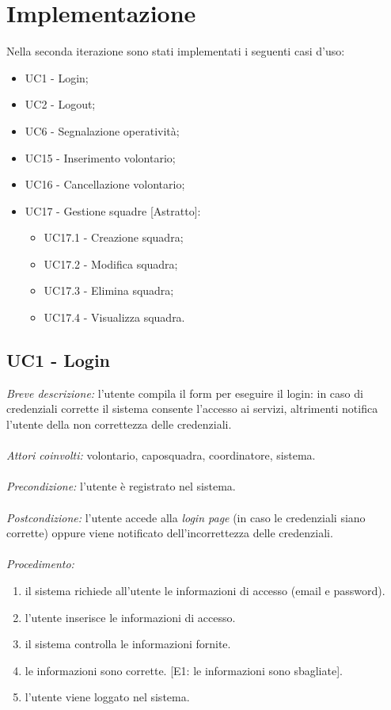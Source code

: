 \section{Implementazione}
Nella seconda iterazione sono stati implementati i seguenti casi d'uso:
\begin{itemize}
	\item UC1 - Login;
	\item UC2 - Logout;
	\item UC6 - Segnalazione operatività;
	\item UC15 - Inserimento volontario;
	\item UC16 - Cancellazione volontario;
	\item UC17 - Gestione squadre [Astratto]:
	\begin{itemize}
		\item UC17.1 - Creazione squadra;
		\item UC17.2 - Modifica squadra;
		\item UC17.3 - Elimina squadra;
		\item UC17.4 - Visualizza squadra.
	\end{itemize}
\end{itemize}

\subsection{UC1 - Login}
\textit{Breve descrizione:} l'utente compila il form per eseguire il login: in caso di credenziali corrette il sistema consente l'accesso ai servizi, altrimenti notifica l'utente della non correttezza delle credenziali. 
\\
\\
\textit{Attori coinvolti:} volontario, caposquadra, coordinatore, sistema.
\\
\\
\textit{Precondizione:} l'utente è registrato nel sistema.
\\
\\
\textit{Postcondizione:} l'utente accede alla \textit{login page} (in caso le credenziali siano corrette) oppure viene notificato dell'incorrettezza delle credenziali.
\\
\\
\textit{Procedimento:}
\begin{enumerate}
	\item il sistema richiede all'utente le informazioni di accesso (email e password).
	\item l'utente inserisce le informazioni di accesso.
	\item il sistema controlla le informazioni fornite.
	\item le informazioni sono corrette. [E1: le informazioni sono sbagliate].
	\item l'utente viene loggato nel sistema.
\end{enumerate}


